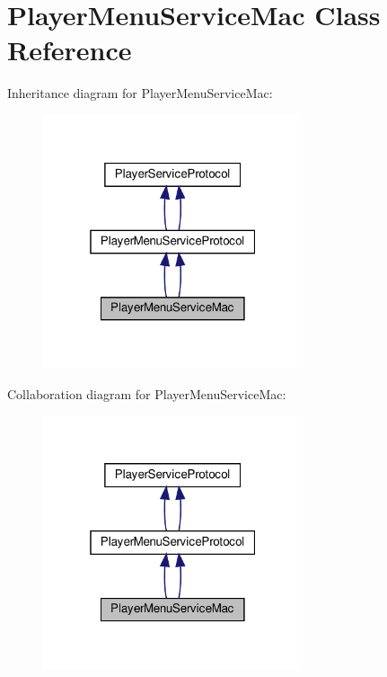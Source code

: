 \hypertarget{classPlayerMenuServiceMac}{}\section{Player\+Menu\+Service\+Mac Class Reference}
\label{classPlayerMenuServiceMac}


Inheritance diagram for Player\+Menu\+Service\+Mac\+:
\nopagebreak
\begin{figure}[H]
\begin{center}
\leavevmode
\includegraphics[width=217pt]{classPlayerMenuServiceMac__inherit__graph}
\end{center}
\end{figure}


Collaboration diagram for Player\+Menu\+Service\+Mac\+:
\nopagebreak
\begin{figure}[H]
\begin{center}
\leavevmode
\includegraphics[width=217pt]{classPlayerMenuServiceMac__coll__graph}
\end{center}
\end{figure}
